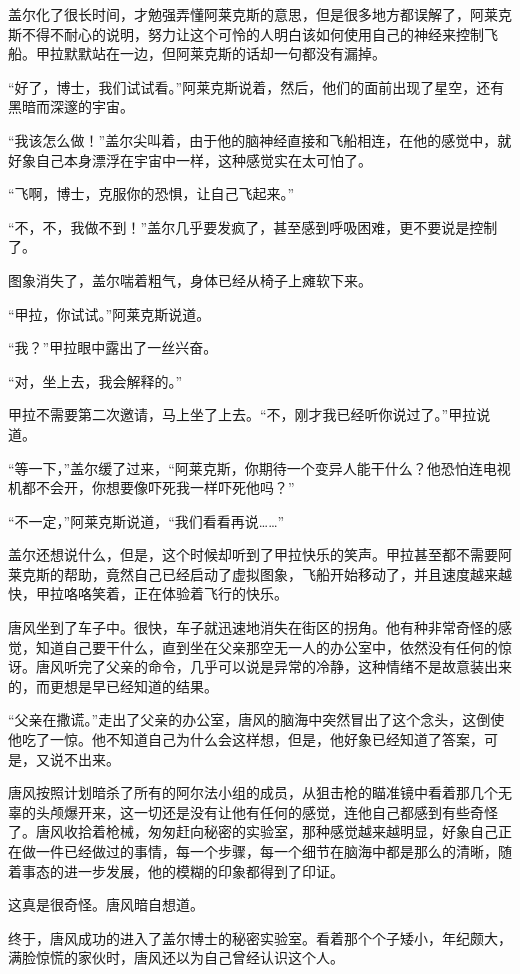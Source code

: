 盖尔化了很长时间，才勉强弄懂阿莱克斯的意思，但是很多地方都误解了，阿莱克斯不得不耐心的说明，努力让这个可怜的人明白该如何使用自己的神经来控制飞船。甲拉默默站在一边，但阿莱克斯的话却一句都没有漏掉。 

“好了，博士，我们试试看。”阿莱克斯说着，然后，他们的面前出现了星空，还有黑暗而深邃的宇宙。 

“我该怎么做！”盖尔尖叫着，由于他的脑神经直接和飞船相连，在他的感觉中，就好象自己本身漂浮在宇宙中一样，这种感觉实在太可怕了。 

“飞啊，博士，克服你的恐惧，让自己飞起来。” 

“不，不，我做不到！”盖尔几乎要发疯了，甚至感到呼吸困难，更不要说是控制了。 

图象消失了，盖尔喘着粗气，身体已经从椅子上瘫软下来。 

“甲拉，你试试。”阿莱克斯说道。 

“我？”甲拉眼中露出了一丝兴奋。 

“对，坐上去，我会解释的。” 

甲拉不需要第二次邀请，马上坐了上去。“不，刚才我已经听你说过了。”甲拉说道。 

“等一下，”盖尔缓了过来，“阿莱克斯，你期待一个变异人能干什么？他恐怕连电视机都不会开，你想要像吓死我一样吓死他吗？” 

“不一定，”阿莱克斯说道，“我们看看再说……” 

盖尔还想说什么，但是，这个时候却听到了甲拉快乐的笑声。甲拉甚至都不需要阿莱克斯的帮助，竟然自己已经启动了虚拟图象，飞船开始移动了，并且速度越来越快，甲拉咯咯笑着，正在体验着飞行的快乐。 

唐风坐到了车子中。很快，车子就迅速地消失在街区的拐角。他有种非常奇怪的感觉，知道自己要干什么，直到坐在父亲那空无一人的办公室中，依然没有任何的惊讶。唐风听完了父亲的命令，几乎可以说是异常的冷静，这种情绪不是故意装出来的，而更想是早已经知道的结果。 

“父亲在撒谎。”走出了父亲的办公室，唐风的脑海中突然冒出了这个念头，这倒使他吃了一惊。他不知道自己为什么会这样想，但是，他好象已经知道了答案，可是，又说不出来。 

唐风按照计划暗杀了所有的阿尔法小组的成员，从狙击枪的瞄准镜中看着那几个无辜的头颅爆开来，这一切还是没有让他有任何的感觉，连他自己都感到有些奇怪了。唐风收拾着枪械，匆匆赶向秘密的实验室，那种感觉越来越明显，好象自己正在做一件已经做过的事情，每一个步骤，每一个细节在脑海中都是那么的清晰，随着事态的进一步发展，他的模糊的印象都得到了印证。 

这真是很奇怪。唐风暗自想道。 

终于，唐风成功的进入了盖尔博士的秘密实验室。看着那个个子矮小，年纪颇大，满脸惊慌的家伙时，唐风还以为自己曾经认识这个人。 

